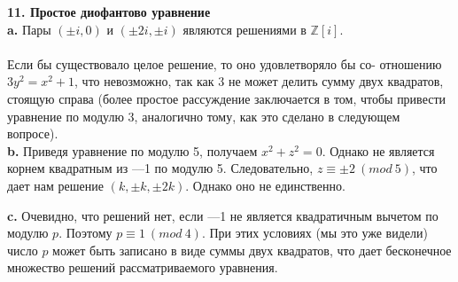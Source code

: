 \documentclass{mai_book}
\begin{document}
\noindent\textbf{11. Простое \textbf{диофантово уравнение} } \newline 
\\
\hspace*{15pt}\textbf{a.} Пары $(\pm i,0)$ и $(\pm 2i,\pm i)$ являются решениями в $\mathbb{Z}[i]$.\\
\\
Если бы существовало целое решение, то оно удовлетворяло бы со-\linebreak
отношению $3y^2=x^2+1$, что невозможно, так как 3 не может делить\linebreak
\pagebreak
%
%
\noindent сумму двух квадратов, стоящую справа (более простое рассуждение \linebreak
за­ключается в том, чтобы привести уравнение по модулю 3, аналогично\linebreak
тому, как это сделано в следующем вопросе).\newline
\\
\hspace*{15pt}\textbf{b.} Приведя уравнение по модулю 5, получаем $x^2+z^2=0$. Однако не является корнем квадратным из —1 по модулю 5. Следовательно,\linebreak
$z\equiv\pm2~(mod~5)$, что дает нам решение $(k,\pm k,\pm 2k)$. Однако оно не\linebreak
единственно.\newline

\noindent\hspace*{15pt}\textbf{c.} Очевидно, что решений нет, если —1 не является квадратичным\linebreak
вычетом по модулю $p$. Поэтому $p\equiv1~(mod~4)$. При этих условиях (мы это\linebreak
уже видели) число $p$ может быть записано в виде суммы двух квадратов,\linebreak
что дает бесконечное множество решений рассматриваемого уравнения.\newline
\\
\end{document}

